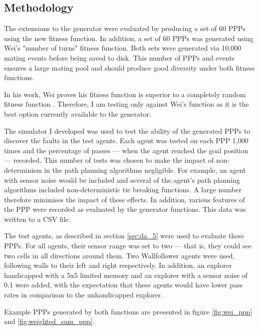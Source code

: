 \documentclass[authoryearcitations]{UoYCSproject}
\begin{document}
\subsection{Methodology}
\label{sec:gen_eval_method}

The extensions to the generator were evaluated by producing a set of 60 PPPs using the new fitness function. In addition, a set of 60 PPPs was generated using Wei's "number of turns" fitness function. Both sets were generated via 10,000 mating events before being saved to disk. This number of PPPs and events ensures a large mating pool and should produce good diversity under both fitness functions.

In his work, Wei proves his fitness function is superior to a completely random fitness function \cite[chapter 6]{wei}. Therefore, I am testing only against Wei's function as it is the best option currently available to the generator.

The simulator I developed was used to test the ability of the generated PPPs to discover the faults in the test agents. Each agent was tested on each PPP 1,000 times and the percentage of passes --- when the agent reached the goal position --- recorded. This number of tests was chosen to make the impact of non-determinism in the path planning algorithms negligible. For example, an agent with sensor noise would be included and several of the agent's path planning algorithms included non-deterministic tie breaking functions. A large number therefore minimises the impact of these effects. In addition, various features of the PPP were recorded as evaluated by the generator functions. This data was written to a CSV file.

The test agents, as described in section \ref{sec:da_5} were used to evaluate these PPPs. For all agents, their sensor range was set to two --- that is, they could see two cells in all directions around them. Two Wallfollower agents were used, following walls to their left and right respectively. In addition, an explorer handicapped with a 5x5 limited memory and an explorer with a sensor noise of 0.1 were added, with the expectation that these agents would have lower pass rates in comparison to the unhandicapped explorer.

Example PPPs generated by both functions are presented in figure \ref{fig:wei_ppp} and \ref{fig:weighted_sum_ppp}.
\end{document}
